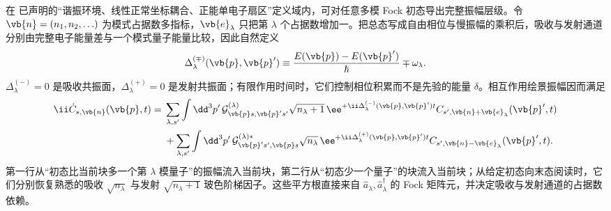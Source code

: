 在 已声明的“谐振环境、线性正常坐标耦合、正能单电子扇区”定义域内，可对任意多模 Fock 初态导出完整振幅层级。令 $\vb{n}=(n_1,n_2,\ldots)$ 为模式占据数多指标，$\vb{e}_\lambda$ 只把第 $\lambda$ 个占据数增加一。把总态写成自由相位与慢振幅的乘积后，吸收与发射通道分别由完整电子能量差与一个模式量子能量比较，因此自然定义
\[
\Delta^{(\mp)}_\lambda(\vb{p},\vb{p}')
\equiv
\frac{E(\vb{p})-E(\vb{p}')}{\hbar}\mp\omega_\lambda .
\]
$\Delta^{(-)}_\lambda=0$ 是吸收共振面，$\Delta^{(+)}_\lambda=0$ 是发射共振面；有限作用时间时，它们控制相位积累而不是先验的能量 $\delta$。相互作用绘景振幅因而满足
\begin{equation}
{
\begin{aligned}
\ii\dot C_{s,\vb{n}}(\vb{p},t)
={}&\sum_{\lambda,s'}\int\dd^3 p'\,
\mathcal G^{(\lambda)}_{\vb{p} s,\vb{p}'s'}
\sqrt{n_\lambda+1}\,
\ee^{+\ii\Delta^{(-)}_{\lambda}(\vb{p},\vb{p}')t}
C_{s',\vb{n}+\vb{e}_\lambda}(\vb{p}',t)\\
&+\sum_{\lambda,s'}\int\dd^3 p'\,
\mathcal G^{(\lambda)*}_{\vb{p}'s',\vb{p} s}
\sqrt{n_\lambda}\,
\ee^{+\ii\Delta^{(+)}_{\lambda}(\vb{p},\vb{p}')t}
C_{s',\vb{n}-\vb{e}_\lambda}(\vb{p}',t).
\end{aligned}}
\label{eq:universal_multiboson_amplitude_hierarchy}
\end{equation}
第一行从“初态比当前块多一个第 $\lambda$ 模量子”的振幅流入当前块，第二行从“初态少一个量子”的块流入当前块；从给定初态向末态阅读时，它们分别恢复熟悉的吸收 $\sqrt{n_\lambda}$ 与发射 $\sqrt{n_\lambda+1}$ 玻色阶梯因子。这些平方根直接来自 $\hat a_\lambda,\hat a_\lambda^\dagger$ 的 Fock 矩阵元，并决定吸收与发射通道的占据数依赖。

